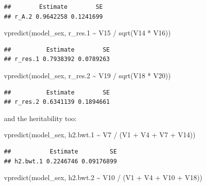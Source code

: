 \documentclass[
  12pt,
]{book}
\newenvironment{Shaded}{\begin{snugshade}}{\end{snugshade}}
\newcommand{\FloatTok}[1]{\textcolor[rgb]{0.00,0.00,0.81}{#1}}
\newcommand{\FunctionTok}[1]{\textcolor[rgb]{0.00,0.00,0.00}{#1}}
\newcommand{\NormalTok}[1]{#1}
\newcommand{\SpecialCharTok}[1]{\textcolor[rgb]{0.00,0.00,0.00}{#1}}
\begin{document}
\begin{verbatim}
##        Estimate        SE
## r_A.2 0.9642258 0.1241699
\end{verbatim}

\begin{Shaded}
\begin{Highlighting}[]
\FunctionTok{vpredict}\NormalTok{(model\_sex, r\_res}\FloatTok{.1} \SpecialCharTok{\textasciitilde{}}\NormalTok{ V15 }\SpecialCharTok{/} \FunctionTok{sqrt}\NormalTok{(V14 }\SpecialCharTok{*}\NormalTok{ V16))}
\end{Highlighting}
\end{Shaded}

\begin{verbatim}
##          Estimate        SE
## r_res.1 0.7938392 0.0789263
\end{verbatim}

\begin{Shaded}
\begin{Highlighting}[]
\FunctionTok{vpredict}\NormalTok{(model\_sex, r\_res}\FloatTok{.2} \SpecialCharTok{\textasciitilde{}}\NormalTok{ V19 }\SpecialCharTok{/} \FunctionTok{sqrt}\NormalTok{(V18 }\SpecialCharTok{*}\NormalTok{ V20))}
\end{Highlighting}
\end{Shaded}

\begin{verbatim}
##          Estimate        SE
## r_res.2 0.6341139 0.1894661
\end{verbatim}

and the heritability too:

\begin{Shaded}
\begin{Highlighting}[]
\FunctionTok{vpredict}\NormalTok{(model\_sex, h2.bwt}\FloatTok{.1} \SpecialCharTok{\textasciitilde{}}\NormalTok{ V7 }\SpecialCharTok{/}\NormalTok{ (V1 }\SpecialCharTok{+}\NormalTok{ V4 }\SpecialCharTok{+}\NormalTok{ V7 }\SpecialCharTok{+}\NormalTok{ V14))}
\end{Highlighting}
\end{Shaded}

\begin{verbatim}
##           Estimate         SE
## h2.bwt.1 0.2246746 0.09176899
\end{verbatim}

\begin{Shaded}
\begin{Highlighting}[]
\FunctionTok{vpredict}\NormalTok{(model\_sex, h2.bwt}\FloatTok{.2} \SpecialCharTok{\textasciitilde{}}\NormalTok{ V10 }\SpecialCharTok{/}\NormalTok{ (V1 }\SpecialCharTok{+}\NormalTok{ V4 }\SpecialCharTok{+}\NormalTok{ V10 }\SpecialCharTok{+}\NormalTok{ V18))}
\end{Highlighting}
\end{Shaded}
\end{document}
